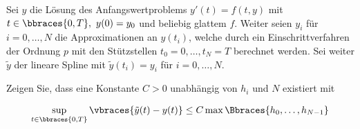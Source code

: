 \begin{exercise}
  Sei $y$ die Lösung des Anfangswertproblems
  $y'(t) = f(t,y)$ mit $t \in \bbraces{0,T}, \text{ } y(0)=y_0$
  und beliebig glattem $f$. Weiter seien $y_i$ für $i=0,\ldots,N$ die Approximationen
  an $y(t_i)$, welche durch ein Einschrittverfahren der Ordnung $p$ mit den
  Stützstellen $t_0 = 0,\ldots,t_N =T$ berechnet werden. Sei weiter $\tilde{y}$ der
  lineare Spline mit $\tilde{y}(t_i)=y_i$ für $i=0,\ldots,N$.

  Zeigen Sie, dass eine Konstante $C>0$ unabhängig von $h_i$ und $N$ existiert mit

  \begin{align}
    \sup_{t \in \bbraces{0,T}} \vbraces{\tilde{y}(t)-y(t)}
    \leq
    C \max\Bbraces{h_0,\ldots,h_{N-1}}
  \end{align}
\end{exercise}

